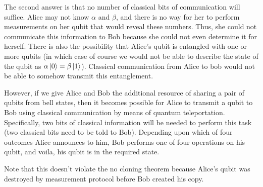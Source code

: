 The second answer is that no number of classical bits of communication will suffice. Alice may not know $\alpha$ and $\beta$, and there is no way for her to perform measurements on her qubit that would reveal these numbers. Thus, she could not communicate this information to Bob because she could not even determine it for herself. There is also the possibility that Alice's qubit is entangled with one or more qubits (in which case of course we would not be able to describe the state of the qubit as $\alpha\ket{0}=\beta\ket{1}$). Classical communication from Alice to bob would not be able to somehow transmit this entanglement.

However, if we give Alice and Bob the additional resource of sharing a pair of qubits from bell states, then it becomes possible for Alice to transmit a qubit to Bob using classical communication by means of quantum teleportation. Specifically, two bits of classical information will be needed to perform this task (two classical bits need to be told to Bob). Depending upon which of four outcomes Alice announces to him, Bob performs one of four operations on his qubit, and voila, his qubit is in the required state.

Note that this doesn't violate the no cloning theorem because Alice's qubit was destroyed by measurement protocol before Bob created his copy.

